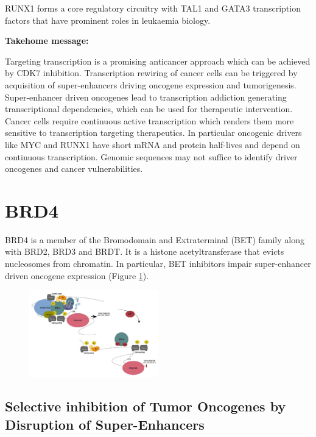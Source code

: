 RUNX1 forms a core regulatory circuitry with TAL1 and GATA3 transcription factors that have prominent roles in leukaemia biology.

\textbf{Takehome message:}

Targeting transcription is a promising anticancer approach which can be achieved by CDK7 inhibition. Transcription rewiring of cancer cells can be triggered by acquisition of super-enhancers driving oncogene expression and tumorigenesis. Super-enhancer driven oncogenes lead to transcription addiction generating transcriptional dependencies, which can be used for therapeutic intervention. Cancer cells require continuous active transcription which renders them more sensitive to transcription targeting therapeutics. In particular oncogenic drivers like MYC and RUNX1 have short mRNA and protein half-lives and depend on continuous transcription. Genomic sequences may not suffice to identify driver oncogenes and cancer vulnerabilities.

\hypertarget{brd4}{%
\section{BRD4}\label{brd4}}

BRD4 is a member of the Bromodomain and Extraterminal (BET) family along
with BRD2, BRD3 and BRDT. It is a histone acetyltransferase that evicts nucleosomes from chromatin. In particular, BET inhibitors impair super-enhancer driven oncogene expression (Figure \ref{fig:brd4}).

\begin{figure}
\centering
\includegraphics[width=0.5\textwidth]{../_resources/Screen_Shot_2022-11-13_at_19-35-28.png}
\caption{}
\label{fig:brd4}
\end{figure}

\hypertarget{selective-inhibition-of-tumor-oncogenes-by-disruption-of-super-enhancers}{%
\subsection{Selective inhibition of Tumor Oncogenes by Disruption of Super-Enhancers}\label{selective-inhibition-of-tumor-oncogenes-by-disruption-of-super-enhancers}}

